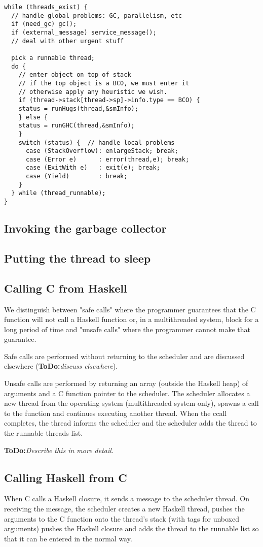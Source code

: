 \documentclass[11pt]{article}
\newcommand{\ToDo}[1]{{{\bf ToDo:}\sl #1}}
\newcommand{\Subsection}[2]{\subsection{#1}\label{sec:#2}}
\begin{document}
\begin{verbatim}
while (threads_exist) {
  // handle global problems: GC, parallelism, etc
  if (need_gc) gc();  
  if (external_message) service_message();
  // deal with other urgent stuff

  pick a runnable thread;
  do {
    // enter object on top of stack
    // if the top object is a BCO, we must enter it
    // otherwise apply any heuristic we wish.
    if (thread->stack[thread->sp]->info.type == BCO) {
	status = runHugs(thread,&smInfo);
    } else {
	status = runGHC(thread,&smInfo);
    }
    switch (status) {  // handle local problems
      case (StackOverflow): enlargeStack; break;
      case (Error e)      : error(thread,e); break;
      case (ExitWith e)   : exit(e); break;
      case (Yield)        : break;
    }
  } while (thread_runnable);
}
\end{verbatim}

\Subsection{Invoking the garbage collector}{ghc-invoking-gc}

\Subsection{Putting the thread to sleep}{ghc-thread-sleeps}

\Subsection{Calling C from Haskell}{ghc-ccall}

We distinguish between "safe calls" where the programmer guarantees
that the C function will not call a Haskell function or, in a
multithreaded system, block for a long period of time and "unsafe
calls" where the programmer cannot make that guarantee.  

Safe calls are performed without returning to the scheduler and are
discussed elsewhere (\ToDo{discuss elsewhere}).

Unsafe calls are performed by returning an array (outside the Haskell
heap) of arguments and a C function pointer to the scheduler.  The
scheduler allocates a new thread from the operating system
(multithreaded system only), spawns a call to the function and
continues executing another thread.  When the ccall completes, the
thread informs the scheduler and the scheduler adds the thread to the
runnable threads list.  

\ToDo{Describe this in more detail.}


\Subsection{Calling Haskell from C}{ghc-c-calls-haskell}

When C calls a Haskell closure, it sends a message to the scheduler
thread.  On receiving the message, the scheduler creates a new Haskell
thread, pushes the arguments to the C function onto the thread's stack
(with tags for unboxed arguments) pushes the Haskell closure and adds
the thread to the runnable list so that it can be entered in the
normal way.
\end{document}
